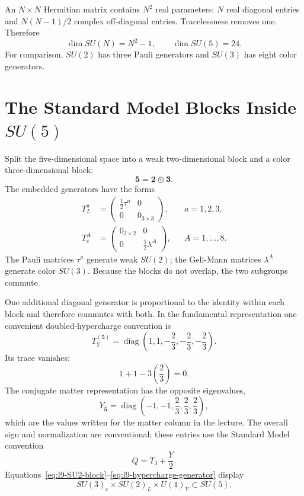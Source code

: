 An \(N\times N\) Hermitian matrix contains \(N^2\) real parameters: \(N\) real diagonal entries and \(N(N-1)/2\) complex off-diagonal entries. Tracelessness removes one. Therefore
\begin{equation}
\dim SU(N)=N^2-1,
\qquad
\dim SU(5)=24.
\label{eq:l9-SU5-dimension}
\end{equation}
For comparison, \(SU(2)\) has three Pauli generators and \(SU(3)\) has eight color generators.

\section{The Standard Model Blocks Inside \texorpdfstring{\(SU(5)\)}{SU(5)}}

Split the five-dimensional space into a weak two-dimensional block and a color three-dimensional block:
\begin{equation}
\mathbf5=\mathbf2\oplus\mathbf3.
\end{equation}
The embedded generators have the forms
\begin{align}
T^a_L
&=
\begin{pmatrix}
\tfrac12\tau^a&0\\
0&0_{3\times3}
\end{pmatrix},
&& a=1,2,3,
\label{eq:l9-SU2-block}\\
T^A_c
&=
\begin{pmatrix}
0_{2\times2}&0\\
0&\tfrac12\lambda^A
\end{pmatrix},
&& A=1,\ldots,8.
\label{eq:l9-SU3-block}
\end{align}
The Pauli matrices \(\tau^a\) generate weak \(SU(2)\); the Gell-Mann matrices \(\lambda^A\) generate color \(SU(3)\). Because the blocks do not overlap, the two subgroups commute.

One additional diagonal generator is proportional to the identity within each block and therefore commutes with both. In the fundamental representation one convenient doubled-hypercharge convention is
\begin{equation}
T_Y^{(\mathbf5)}=
\operatorname{diag}
\left(
1,1,-\frac23,-\frac23,-\frac23
\right).
\label{eq:l9-hypercharge-generator}
\end{equation}
Its trace vanishes:
\begin{equation}
1+1-3\left(\frac23\right)=0.
\end{equation}
The conjugate matter representation has the opposite eigenvalues,
\begin{equation}
Y_{\overline{\mathbf5}}
=
\operatorname{diag}
\left(
-1,-1,\frac23,\frac23,\frac23
\right),
\label{eq:l9-fivebar-hypercharge}
\end{equation}
which are the values written for the matter column in the lecture. The overall sign and normalization are conventional; these entries use the Standard Model convention
\begin{equation}
Q=T_3+\frac{Y}{2}.
\label{eq:l9-charge}
\end{equation}
Equations~\eqref{eq:l9-SU2-block}--\eqref{eq:l9-hypercharge-generator} display
\begin{equation}
SU(3)_c\times SU(2)_L\times U(1)_Y
\subset SU(5).
\end{equation}

